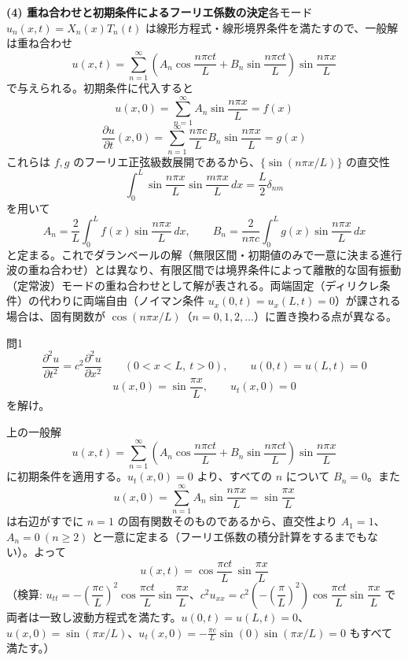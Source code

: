 \documentclass[a4paper,11pt]{article}
\begin{document}
\medskip
\noindent
\textbf{(4) 重ね合わせと初期条件によるフーリエ係数の決定}\quad 各モード $u_{n}(x,t) = X_{n}(x)T_{n}(t)$ は線形方程式・線形境界条件を満たすので、一般解は重ね合わせ
\[
u(x,t) = \sum_{n=1}^{\infty}\left(A_{n}\cos\frac{n\pi c t}{L} + B_{n}\sin\frac{n\pi c t}{L}\right)\sin\frac{n\pi x}{L}
\]
で与えられる。初期条件に代入すると
\[
u(x,0) = \sum_{n=1}^{\infty} A_{n}\sin\frac{n\pi x}{L} = f(x)
\]
\[
\frac{\partial u}{\partial t}(x,0) = \sum_{n=1}^{\infty} \frac{n\pi c}{L}B_{n}\sin\frac{n\pi x}{L} = g(x)
\]
これらは $f,g$ のフーリエ正弦級数展開であるから、$\{\sin(n\pi x/L)\}$ の直交性
\[
\int_{0}^{L}\sin\frac{n\pi x}{L}\sin\frac{m\pi x}{L}\,dx = \frac{L}{2}\delta_{nm}
\]
を用いて
\[
A_{n} = \frac{2}{L}\int_{0}^{L} f(x)\sin\frac{n\pi x}{L}\,dx,
\qquad
B_{n} = \frac{2}{n\pi c}\int_{0}^{L} g(x)\sin\frac{n\pi x}{L}\,dx
\]
と定まる。これでダランベールの解（無限区間・初期値のみで一意に決まる進行波の重ね合わせ）とは異なり、有限区間では境界条件によって離散的な固有振動（定常波）モードの重ね合わせとして解が表される。両端固定（ディリクレ条件）の代わりに両端自由（ノイマン条件 $u_x(0,t)=u_x(L,t)=0$）が課される場合は、固有関数が $\cos(n\pi x/L)$（$n=0,1,2,\dots$）に置き換わる点が異なる。

\clearpage
\begin{mondaiboxS}{問1}
\[
\frac{\partial^{2} u}{\partial t^{2}} = c^{2}\frac{\partial^{2} u}{\partial x^{2}} \qquad (0 < x < L,\ t > 0), \qquad u(0,t)=u(L,t)=0
\]
\[
u(x,0) = \sin\frac{\pi x}{L}, \qquad u_{t}(x,0) = 0
\]
を解け。
\end{mondaiboxS}
\kaitou
上の一般解
\[
u(x,t) = \sum_{n=1}^{\infty}\left(A_{n}\cos\frac{n\pi c t}{L} + B_{n}\sin\frac{n\pi c t}{L}\right)\sin\frac{n\pi x}{L}
\]
に初期条件を適用する。$u_{t}(x,0) = 0$ より、すべての $n$ について $B_{n} = 0$。また
\[
u(x,0) = \sum_{n=1}^{\infty} A_{n}\sin\frac{n\pi x}{L} = \sin\frac{\pi x}{L}
\]
は右辺がすでに $n=1$ の固有関数そのものであるから、直交性より $A_{1} = 1$、$A_{n} = 0\ (n \ge 2)$ と一意に定まる（フーリエ係数の積分計算をするまでもない）。よって
\[
\boxed{\; u(x,t) = \cos\frac{\pi c t}{L}\,\sin\frac{\pi x}{L} \;}
\]
（検算: $u_{tt} = -\left(\dfrac{\pi c}{L}\right)^{2}\cos\dfrac{\pi ct}{L}\sin\dfrac{\pi x}{L}$、$c^{2}u_{xx} = c^{2}\left(-\left(\dfrac{\pi}{L}\right)^{2}\right)\cos\dfrac{\pi ct}{L}\sin\dfrac{\pi x}{L}$ で両者は一致し波動方程式を満たす。$u(0,t)=u(L,t)=0$、$u(x,0)=\sin(\pi x/L)$、$u_t(x,0) = -\frac{\pi c}{L}\sin(0)\sin(\pi x/L)=0$ もすべて満たす。）
\end{document}
